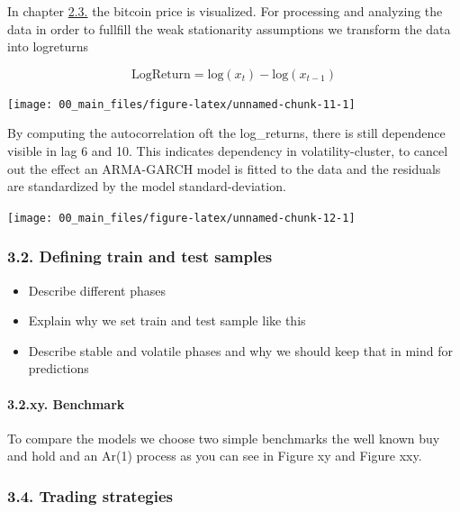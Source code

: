 \documentclass[
]{article}
\begin{document}
In chapter \protect\hyperlink{bitcoin}{2.3.} the bitcoin price is
visualized. For processing and analyzing the data in order to fullfill
the weak stationarity assumptions we transform the data into logreturns

\[\mathrm{LogReturn} = \mathrm{log}(x_{t})-\mathrm{log}(x_{t-1})\]

\begin{center}\texttt{[image: 00\_main\_files/figure-latex/unnamed-chunk-11-1]} \end{center}

By computing the autocorrelation oft the log\_returns, there is still
dependence visible in lag 6 and 10. This indicates dependency in
volatility-cluster, to cancel out the effect an ARMA-GARCH model is
fitted to the data and the residuals are standardized by the model
standard-deviation.

\begin{center}\texttt{[image: 00\_main\_files/figure-latex/unnamed-chunk-12-1]} \end{center}

\hypertarget{defining-train-and-test-samples}{%
\subsubsection{3.2. Defining train and test
samples}\label{defining-train-and-test-samples}}

\begin{itemize}
\item
  Describe different phases
\item
  Explain why we set train and test sample like this
\item
  Describe stable and volatile phases and why we should keep that in
  mind for predictions
\end{itemize}

\hypertarget{xy.-benchmark}{%
\paragraph{3.2.xy. Benchmark}\label{xy.-benchmark}}

To compare the models we choose two simple benchmarks the well known buy
and hold and an Ar(1) process as you can see in Figure xy and Figure
xxy.

\hypertarget{trading-strategies}{%
\subsubsection{3.4. Trading strategies}\label{trading-strategies}}
\end{document}
